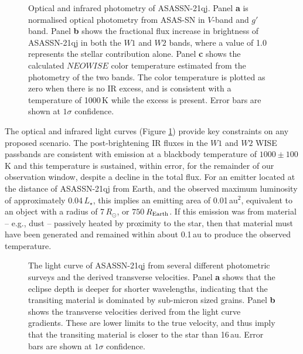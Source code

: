 \documentclass[sn-nature]{sn-jnl}%
\begin{document}
\begin{figure}
\begin{centering}
\caption{Optical and infrared photometry of ASASSN-21qj.
%
Panel {\bf a} is normalised optical photometry from ASAS-SN in $V$-band and $g'$ band.
%
Panel {\bf b} shows the fractional flux increase in brightness of ASASSN-21qj in both the $W1$ and $W2$ bands, where a value of 1.0 represents the stellar contribution alone.
%
Panel {\bf c} shows the calculated $NEOWISE$ color temperature estimated from the photometry of the two bands.
%
The color temperature is plotted as zero when there is no IR excess, and is consistent with a temperature of 1000\,K while the excess is present.
%
Error bars are shown at $1\sigma$ confidence.
}
\label{fig:wisephot}
\end{centering}
\end{figure}





The optical and infrared light curves (Figure \ref{fig:wisephot}) provide key constraints on any proposed scenario.
%
The post-brightening IR fluxes in the $W1$ and $W2$ WISE passbands are consistent with emission at a blackbody temperature of $1000 \pm 100$\,K and this temperature is sustained, within error, for the remainder of our observation window, despite a decline in the total flux.
%
For an emitter located at the distance of ASASSN-21qj from Earth, and the observed  maximum luminosity of approximately 0.04\,$L_\star$, this implies an emitting area of 0.01\,au$^2$, equivalent to an object with a radius of 7\,$R_\odot$, or $750$\,$R_{\rm Earth}$.
%
If this emission was from material -- e.g., dust -- passively heated by proximity to the star, then that material must have been generated and remained within about 0.1\,au to produce the observed temperature.


\begin{figure*}
\begin{centering}
      \caption{The light curve of ASASSN-21qj from several different photometric surveys and the derived transverse velocities.
      Panel {\bf a} shows that the eclipse depth is deeper for shorter wavelengths, indicating that the transiting material is dominated by sub-micron sized grains.
      Panel {\bf b} shows the  transverse velocities derived from the light curve gradients.
      These are lower limits to the true velocity, and thus imply that the transiting material is closer to the star than 16\,au.
      Error bars are shown at $1\sigma$ confidence.
      }
        \label{fig:eclipse_overview}
\end{centering}
\end{figure*}
\end{document}
